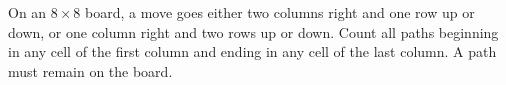 On an $8\times8$ board, a move goes either two columns right and one row up or down, or one column right and two rows up or down. Count all paths beginning in any cell of the first column and ending in any cell of the last column. A path must remain on the board.
